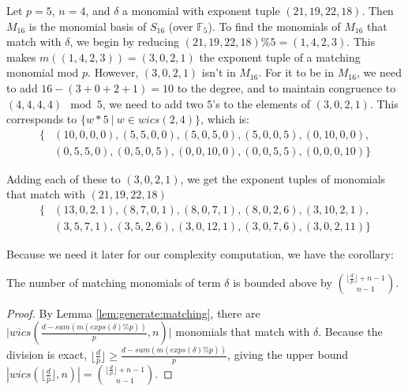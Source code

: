 \begin{ex}
    Let $p = 5$, \(n = 4\), and $\delta$ a monomial 
    with exponent tuple $(21, 19, 22, 18)$. 
    Then $M_{16}$ is the monomial basis of 
    \(S_{16}\) (over $\mathbb{F}_5$). 
    To find the monomials of $M_{16}$ that match with 
    $\delta$, we begin by reducing $(21, 19, 22, 18) \% 5 = (1, 4, 2, 3)$.
    This makes $m((1, 4, 2, 3)) = (3, 0, 2, 1)$ the 
    exponent tuple of a matching monomial mod \(p\).
    However, \((3, 0, 2, 1)\) isn't in $M_{16}$. 
    For it to be in $M_{16}$, we need to add $16 - (3 + 0 + 2 + 1) = 10$ 
    to the degree, and to maintain congruence to 
    $(4, 4, 4, 4) \mod 5$, we need to add two $5$'s 
    to the elements of $(3, 0, 2, 1)$. This corresponds 
    to $\{w * 5 ~|~ w \in wics(2, 4)\}$, which is:
    \begin{align*}
        \{&(10, 0, 0, 0), (5, 5, 0, 0), (5, 0, 5, 0), (5, 0, 0, 5), (0, 10, 0, 0), \\
        &(0, 5, 5, 0), (0, 5, 0, 5), (0, 0, 10, 0), (0, 0, 5, 5), (0, 0, 0, 10)\}
    \end{align*}
        
    \noindent Adding each of these to $(3, 0, 2, 1)$, we get the 
    exponent tuples of monomials that match with $(21, 19, 22, 18)$
    \begin{align*}
        \{&(13, 0, 2, 1), (8, 7, 0, 1), (8, 0, 7, 1), (8, 0, 2, 6), (3, 10, 2, 1), \\
        &(3, 5, 7, 1), (3, 5, 2, 6), (3, 0, 12, 1), (3, 0, 7, 6), (3, 0, 2, 11)\}
    \end{align*}    
\end{ex}

Because we need it later for our complexity computation, we have the corollary:

\begin{cor}
    \label{cor:num:matches}
    The number of matching monomials of term $\delta$ is 
    bounded above by $\binom{\lfloor \frac{d}{p} \rfloor + n - 1}{n - 1}$.
\end{cor}

\begin{proof}
    By Lemma \ref{lem:generate:matching}, there are 
    $\Big |wics \left(\frac{d - sum(m(exps(\delta) \% p))}{p}, n \right) \Big |$ 
    monomials that match with $\delta$.
    Because the division is exact, 
    $\lfloor \frac{d}{p} \rfloor \geq \frac{d - sum(m(exps(\delta) \% p))}{p}$,
    giving the upper bound 
    $|wics(\lfloor \frac{d}{p} \rfloor, n)| = \binom{\lfloor \frac{d}{p} \rfloor + n - 1}{n - 1}$.
\end{proof}

